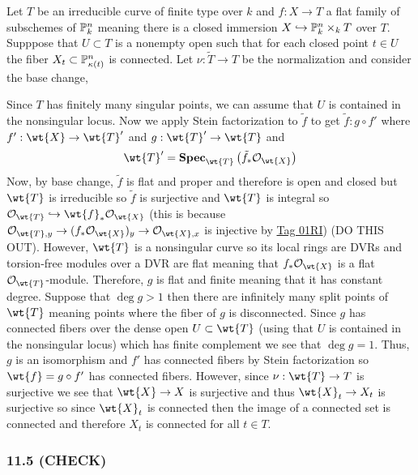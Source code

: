 \documentclass[12pt]{article}
\begin{document}
Let $T$ be an irreducible curve of finite type over $k$ and $f : X \to T$ a flat family of subschemes of $\P^n_k$ meaning there is a closed immersion $X \embed \P^n_k \times_k T$ over $T$. Supppose that $U \subset T$ is a nonempty open such that for each closed point $t \in U$ the fiber $X_t \subset \P^n_{\kappa(t)}$ is connected.
Let $\nu : \tilde{T} \to T$ be the normalization and consider the base change,
\begin{center}
\end{center}
Since $T$ has finitely many singular points, we can assume that $U$ is contained in the nonsingular locus. Now we apply Stein factorization to $\tilde{f}$ to get $\tilde{f} : g \circ f'$ where $f' : \wt{X} \to \wt{T}'$ and $g : \wt{T}' \to \wt{T}$ and
\[ \wt{T}' = \rSpec{\wt{T}}{\tilde{f}_* \struct{\wt{X}}} \]
Now, by base change, $\tilde{f}$ is flat and proper and therefore is open and closed but $\wt{T}$ is irreducible so $\tilde{f}$ is surjective and $\wt{T}$ is integral so $\struct{\wt{T}} \embed \wt{f}_* \struct{\wt{X}}$ (this is because $\stalk{\wt{T}}{y} \to (f_* \struct{\wt{X}})_y \to \stalk{\wt{X}}{x}$ is injective by \href{https://stacks.math.columbia.edu/tag/01RI}{Tag 01RI}) (DO THIS OUT). However, $\wt{T}$ is a nonsingular curve so its local rings are DVRs and torsion-free modules over a DVR are flat meaning that $f_* \struct{\wt{X}}$ is a flat $\struct{\wt{T}}$-module. Therefore, $g$ is flat and finite meaning that it has constant degree. Suppose that $\deg{g} > 1$ then there are infinitely many split points of $\wt{T}$ meaning points where the fiber of $g$ is disconnected. Since $g$ has connected fibers over the dense open $U \subset \wt{T}$ (using that $U$ is contained in the nonsingular locus) which has finite complement we see that $\deg{g} = 1$. Thus, $g$ is an isomorphism and $f'$ has connected fibers by Stein factorization so $\wt{f} = g \circ f'$ has connected fibers. However, since $\nu : \wt{T} \to T$ is surjective we see that $\wt{X} \to X$ is surjective and thus $\wt{X}_t \to X_t$ is surjective so since $\wt{X}_t$ is connected then the image of a connected set is connected and therefore $X_t$ is connected for all $t \in T$.


\subsubsection{11.5 (CHECK)}
\end{document}
